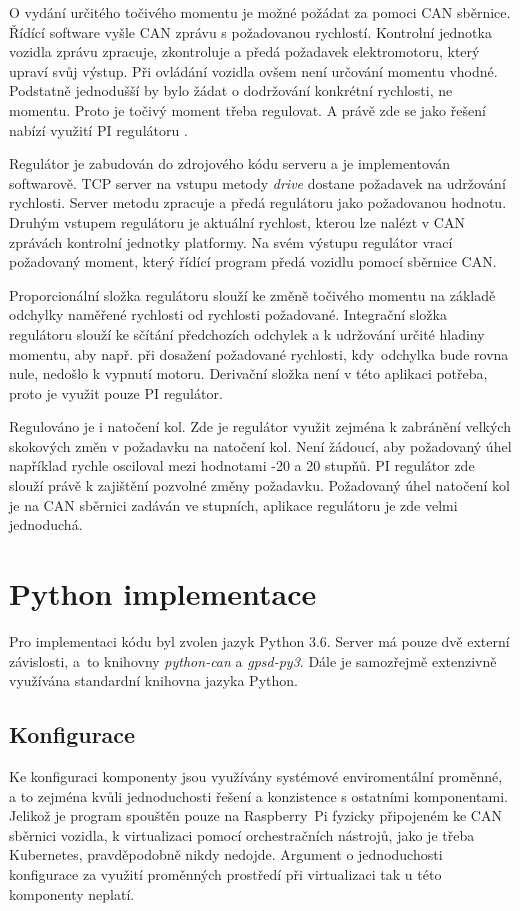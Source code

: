 \documentclass[czech, bachelor]{diploma}
\begin{document}
O vydání určitého točivého momentu je možné požádat za pomoci CAN sběrnice. Řídící software vyšle CAN zprávu s požadovanou
rychlostí. Kontrolní jednotka vozidla zprávu zpracuje, zkontroluje a předá požadavek elektromotoru, který upraví svůj výstup.
Při ovládání vozidla ovšem není určování momentu vhodné. Podstatně jednodušší by bylo žádat o dodržování konkrétní rychlosti,
ne momentu. Proto je točivý moment třeba regulovat. A právě zde se jako řešení nabízí využití PI regulátoru
\cite{pid-controller-source}.

Regulátor je zabudován do zdrojového kódu serveru a je implementován softwarově. TCP server na vstupu metody \emph{drive} dostane
požadavek na udržování rychlosti. Server metodu zpracuje a předá regulátoru jako požadovanou hodnotu. Druhým vstupem regulátoru
je aktuální rychlost, kterou lze nalézt v CAN zprávách kontrolní jednotky platformy. Na svém výstupu regulátor vrací požadovaný
moment, který řídící program předá vozidlu pomocí sběrnice CAN.

Proporcionální složka regulátoru slouží ke změně točivého momentu na základě odchylky naměřené rychlosti od rychlosti požadované.
Integrační složka regulátoru slouží ke sčítání předchozích odchylek a k udržování určité hladiny momentu, aby např. při dosažení
požadované rychlosti, kdy~odchylka bude rovna nule, nedošlo k vypnutí motoru. Derivační složka není v této aplikaci potřeba, proto
je využit pouze PI regulátor.

Regulováno je i natočení kol. Zde je regulátor využit zejména k zabránění velkých skokových změn v požadavku na natočení kol. Není
žádoucí, aby požadovaný úhel například rychle osciloval mezi hodnotami -20 a 20 stupňů. PI regulátor zde slouží právě k zajištění
pozvolné změny požadavku. Požadovaný úhel natočení kol je na CAN sběrnici zadáván ve stupních, aplikace regulátoru je zde velmi
jednoduchá.

\section{Python implementace}

Pro implementaci kódu byl zvolen jazyk Python 3.6. Server má pouze dvě externí závislosti, a~to knihovny \emph{python-can} a
\emph{gpsd-py3}. Dále je samozřejmě extenzivně využívána standardní knihovna jazyka Python.

\subsection{Konfigurace}
Ke konfiguraci komponenty jsou využívány systémové enviromentální proměnné, a to zejména kvůli jednoduchosti řešení a konzistence
s ostatními komponentami. Jelikož je program spouštěn pouze na Raspberry~Pi fyzicky připojeném ke CAN sběrnici vozidla,
k virtualizaci pomocí orchestračních nástrojů, jako je třeba Kubernetes, pravděpodobně nikdy nedojde. Argument o jednoduchosti
konfigurace za využití proměnných prostředí při virtualizaci tak u této komponenty neplatí.
\end{document}
